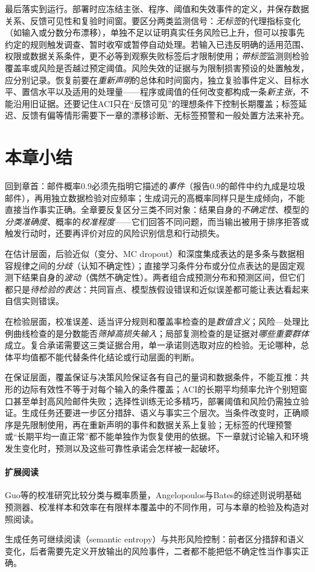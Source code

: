 最后落实到运行。部署时应冻结主张、程序、阈值和失效事件的定义，并保存数据关系、反馈可见性和复验时间窗。要区分两类监测信号：\emph{无标签}的代理指标变化（如输入或分数分布漂移），单独不足以证明真实任务风险已上升，但可以按事先约定的规则触发调查、暂时收窄或暂停自动处理。若输入已违反明确的适用范围、权限或数据关系条件，更不必等到观察失败标签后才限制使用；\emph{带标签}监测则检验覆盖率或风险是否越过预定阈值。风险失效的证据与为限制损害预设的处置触发，应分别记录。恢复前要在\emph{重新声明}的总体和时间窗内，独立复验事件定义、目标水平、置信水平以及适用的处理量——程序或阈值的任何改变都构成一条\emph{新主张}，不能沿用旧证据。还要记住ACI只在“反馈可见”的理想条件下控制长期覆盖；标签延迟、反馈有偏等情形需要下一章的漂移诊断、无标签预警和一般处置方法来补充。

\section{本章小结}
\label{sec:reliability-summary}

回到章首：邮件概率0.9必须先指明它描述的\emph{事件}（报告0.9的邮件中约九成是垃圾邮件），再用独立数据检验对应频率；生成词元的高概率同样只是生成倾向，不能直接当作事实正确。全章要反复区分三类不同对象：结果自身的\emph{不确定性}、模型的\emph{分类准确度}、概率的\emph{校准程度}——它们回答不同问题，而当输出被用于排序拒答或触发行动时，还要再评价对应的风险识别信息和行动损失。

在估计层面，后验近似（变分、MC dropout）和深度集成表达的是多条与数据相容规律之间的\emph{分歧}（认知不确定性）；直接学习条件分布或分位点表达的是固定观测下结果自身的\emph{波动}（偶然不确定性）。两者组合成预测分布和预测区间，但它们都只是\emph{待检验的表达}：共同盲点、模型族假设错误和近似误差都可能让表达看起来自信实则错误。

在检验层面，校准误差、适当评分规则和覆盖率检查的是\emph{数值含义}；风险—处理比例曲线检查的是分数能否\emph{筛掉高损失输入}；局部复测检查的是证据对\emph{哪些重要群体}成立。复合承诺需要这三类证据合用，单一承诺则选取对应的检验。无论哪种，总体平均值都不能代替条件化结论或行动层面的判断。

在保证层面，覆盖保证与决策风险保证各有自己的量词和数据条件，不能互推：共形的边际有效性不等于对每个输入的条件覆盖；ACI的长期平均频率允许个别短窗口甚至单封高风险邮件失败；选择性训练无论多精巧，部署阈值和风险仍需独立验证。生成任务还要进一步区分措辞、语义与事实三个层次。当条件改变时，正确顺序是先限制使用，再在重新声明的事件和数据关系上复验；无标签的代理预警或“长期平均一直正常”都不能单独作为恢复使用的依据。下一章就讨论输入和环境发生变化时，预测以及这些可靠性承诺会怎样被一起破坏。

\paragraph{扩展阅读}

Guo等的校准研究比较分类与概率质量，Angelopoulos与Bates的综述则说明基础预测器、校准样本和效率在有限样本覆盖中的不同作用，可与本章的检验及构造对照阅读。

生成任务可继续阅读（semantic entropy）与共形风险控制：前者区分措辞和语义变化，后者需要先定义开放输出的风险事件，二者都不能把低不确定性当作事实正确。

